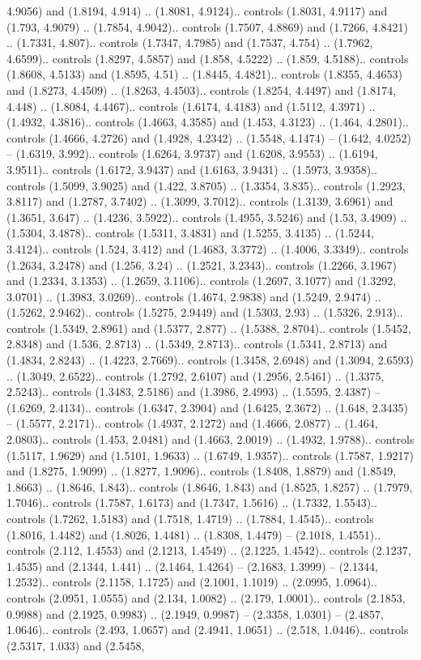 4.9056) and (1.8194, 4.914) .. (1.8081, 4.9124).. controls (1.8031, 4.9117) and (1.793, 4.9079) .. (1.7854, 4.9042).. controls (1.7507, 4.8869) and (1.7266, 4.8421) .. (1.7331, 4.807).. controls (1.7347, 4.7985) and (1.7537, 4.754) .. (1.7962, 4.6599).. controls (1.8297, 4.5857) and (1.858, 4.5222) .. (1.859, 4.5188).. controls (1.8608, 4.5133) and (1.8595, 4.51) .. (1.8445, 4.4821).. controls (1.8355, 4.4653) and (1.8273, 4.4509) .. (1.8263, 4.4503).. controls (1.8254, 4.4497) and (1.8174, 4.448) .. (1.8084, 4.4467).. controls (1.6174, 4.4183) and (1.5112, 4.3971) .. (1.4932, 4.3816).. controls (1.4663, 4.3585) and (1.453, 4.3123) .. (1.464, 4.2801).. controls (1.4666, 4.2726) and (1.4928, 4.2342) .. (1.5548, 4.1474) -- (1.642, 4.0252) -- (1.6319, 3.992).. controls (1.6264, 3.9737) and (1.6208, 3.9553) .. (1.6194, 3.9511).. controls (1.6172, 3.9437) and (1.6163, 3.9431) .. (1.5973, 3.9358).. controls (1.5099, 3.9025) and (1.422, 3.8705) .. (1.3354, 3.835).. controls (1.2923, 3.8117) and (1.2787, 3.7402) .. (1.3099, 3.7012).. controls (1.3139, 3.6961) and (1.3651, 3.647) .. (1.4236, 3.5922).. controls (1.4955, 3.5246) and (1.53, 3.4909) .. (1.5304, 3.4878).. controls (1.5311, 3.4831) and (1.5255, 3.4135) .. (1.5244, 3.4124).. controls (1.524, 3.412) and (1.4683, 3.3772) .. (1.4006, 3.3349).. controls (1.2634, 3.2478) and (1.256, 3.24) .. (1.2521, 3.2343).. controls (1.2266, 3.1967) and (1.2334, 3.1353) .. (1.2659, 3.1106).. controls (1.2697, 3.1077) and (1.3292, 3.0701) .. (1.3983, 3.0269).. controls (1.4674, 2.9838) and (1.5249, 2.9474) .. (1.5262, 2.9462).. controls (1.5275, 2.9449) and (1.5303, 2.93) .. (1.5326, 2.913).. controls (1.5349, 2.8961) and (1.5377, 2.877) .. (1.5388, 2.8704).. controls (1.5452, 2.8348) and (1.536, 2.8713) .. (1.5349, 2.8713).. controls (1.5341, 2.8713) and (1.4834, 2.8243) .. (1.4223, 2.7669).. controls (1.3458, 2.6948) and (1.3094, 2.6593) .. (1.3049, 2.6522).. controls (1.2792, 2.6107) and (1.2956, 2.5461) .. (1.3375, 2.5243).. controls (1.3483, 2.5186) and (1.3986, 2.4993) .. (1.5595, 2.4387) -- (1.6269, 2.4134).. controls (1.6347, 2.3904) and (1.6425, 2.3672) .. (1.648, 2.3435) -- (1.5577, 2.2171).. controls (1.4937, 2.1272) and (1.4666, 2.0877) .. (1.464, 2.0803).. controls (1.453, 2.0481) and (1.4663, 2.0019) .. (1.4932, 1.9788).. controls (1.5117, 1.9629) and (1.5101, 1.9633) .. (1.6749, 1.9357).. controls (1.7587, 1.9217) and (1.8275, 1.9099) .. (1.8277, 1.9096).. controls (1.8408, 1.8879) and (1.8549, 1.8663) .. (1.8646, 1.843).. controls (1.8646, 1.843) and (1.8525, 1.8257) .. (1.7979, 1.7046).. controls (1.7587, 1.6173) and (1.7347, 1.5616) .. (1.7332, 1.5543).. controls (1.7262, 1.5183) and (1.7518, 1.4719) .. (1.7884, 1.4545).. controls (1.8016, 1.4482) and (1.8026, 1.4481) .. (1.8308, 1.4479) -- (2.1018, 1.4551).. controls (2.112, 1.4553) and (2.1213, 1.4549) .. (2.1225, 1.4542).. controls (2.1237, 1.4535) and (2.1344, 1.441) .. (2.1464, 1.4264) -- (2.1683, 1.3999) -- (2.1344, 1.2532).. controls (2.1158, 1.1725) and (2.1001, 1.1019) .. (2.0995, 1.0964).. controls (2.0951, 1.0555) and (2.134, 1.0082) .. (2.179, 1.0001).. controls (2.1853, 0.9988) and (2.1925, 0.9983) .. (2.1949, 0.9987) -- (2.3358, 1.0301) -- (2.4857, 1.0646).. controls (2.493, 1.0657) and (2.4941, 1.0651) .. (2.518, 1.0446).. controls (2.5317, 1.033) and (2.5458, 